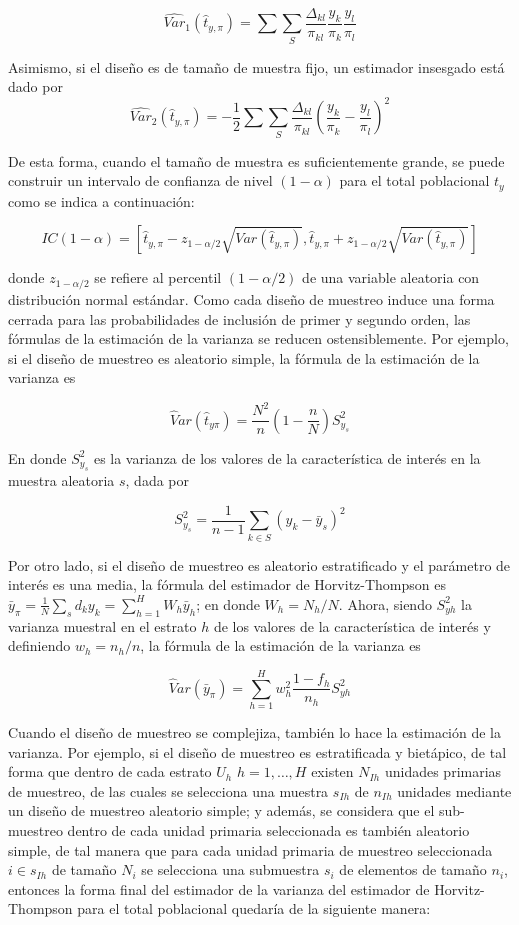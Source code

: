 \documentclass[
  12pt,
]{book}
\begin{document}
\[
\widehat{Var}_1(\hat{t}_{y,\pi})=\sum\sum_S \dfrac{\Delta_{kl}}{\pi_{kl}}\frac{y_k}{\pi_k}\frac{y_l}{\pi_l}
\]

Asimismo, si el diseño es de tamaño de muestra fijo, un estimador insesgado está dado por
\[
\widehat{Var}_2(\hat{t}_{y,\pi})=-\frac{1}{2}\sum\sum_S\frac{\Delta_{kl}}{\pi_{kl}}\left(\frac{y_k}{\pi_k}-\frac{y_l}{\pi_l}\right)^2
\]

De esta forma, cuando el tamaño de muestra es suficientemente grande, se puede construir un intervalo de confianza de nivel \((1-\alpha)\) para el total poblacional \(t_y\) como se indica a continuación:

\[
IC(1-\alpha)=\left[\hat{t}_{y,\pi}-z_{1-\alpha / 2}\sqrt{ Var(\hat{t}_{y,\pi})},\hat{t}_{y,\pi}+z_{1-\alpha / 2}\sqrt{Var(\hat{t}_{y,\pi})}\right]
\]

donde \(z_{1-\alpha / 2}\) se refiere al percentil \((1-\alpha / 2)\) de una variable aleatoria con distribución normal estándar. Como cada diseño de muestreo induce una forma cerrada para las probabilidades de inclusión de primer y segundo orden, las fórmulas de la estimación de la varianza se reducen ostensiblemente. Por ejemplo, si el diseño de muestreo es aleatorio simple, la fórmula de la estimación de la varianza es

\[
\widehat Var(\hat{t}_{y\pi}) = \frac{N^2}{n} \left( 1- \frac{n}{N} \right) S^2_{y_s}
\]

En donde \(S^2_{y_s}\) es la varianza de los valores de la característica de interés en la muestra aleatoria \(s\), dada por

\[
S^2_{y_s}=\frac{1}{n-1}\sum_{k\in S}(y_k-\bar{y}_s)^2
\]

Por otro lado, si el diseño de muestreo es aleatorio estratificado y el parámetro de interés es una media, la fórmula del estimador de Horvitz-Thompson es \(\bar{y}_{\pi} = \frac{1}{N}\sum_s d_k y_k = \sum_{h=1}^H W_h \bar{y}_h\); en donde \(W_h = N_h/N\). Ahora, siendo \(S^2_{yh}\) la varianza muestral en el estrato \(h\) de los valores de la característica de interés y definiendo \(w_h = n_h/n\), la fórmula de la estimación de la varianza es

\[
\widehat Var(\bar{y}_{\pi}) = \sum_{h=1}^H w_h^2 \frac{1-f_h}{n_h}S^2_{yh}
 \]

Cuando el diseño de muestreo se complejiza, también lo hace la estimación de la varianza. Por ejemplo, si el diseño de muestreo es estratificada y bietápico, de tal forma que dentro de cada estrato \(U_h\) \(h=1,\ldots, H\) existen \(N_{Ih}\) unidades primarias de muestreo, de las cuales se selecciona una muestra \(s_{Ih}\) de \(n_{Ih}\) unidades mediante un diseño de muestreo aleatorio simple; y además, se considera que el sub-muestreo dentro de cada unidad primaria seleccionada es también aleatorio simple, de tal manera que para cada unidad primaria de muestreo seleccionada \(i\in s_{Ih}\) de tamaño \(N_i\) se selecciona una submuestra \(s_i\) de elementos de tamaño \(n_i\), entonces la forma final del estimador de la varianza del estimador de Horvitz-Thompson para el total poblacional quedaría de la siguiente manera:
\end{document}

